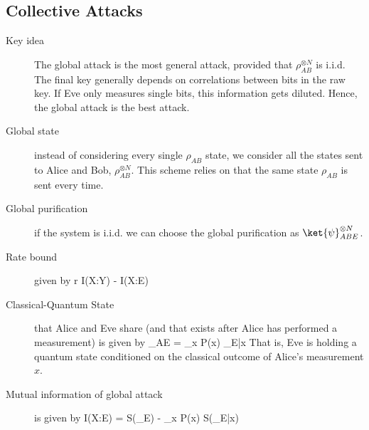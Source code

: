 \subsection{Collective Attacks}
\begin{description}

\item[Key idea] The global attack is the most general attack, provided that $\rho^{\otimes N}_{AB}$ is i.i.d. The final key generally depends on correlations between bits in the raw key. If Eve only measures single bits, this information gets diluted. Hence, the global attack is the best attack. 

\item[Global state] instead of considering every single $\rho_{AB}$ state, we consider all the states sent to Alice and Bob, $\rho_{AB}^{\otimes N}$. This scheme relies on that the same state $\rho_{AB}$ is sent every time. 

\item[Global purification] if the system is i.i.d. we can choose the global purification as $\ket{\psi}_{ABE}^{\otimes N}$. 

\item[Rate bound] given by 
\beq
r \geq I(X:Y) - I(X:E)
\eeq

\item[Classical-Quantum State] that Alice and Eve share (and that exists after Alice has performed a measurement) is given by 
\beq
\rho_{AE} = \sum_x P(x)  \otimes \rho_{E|x}
\eeq
That is, Eve is holding a quantum state conditioned on the classical outcome of Alice's measurement $x$. 

\item[Mutual information of global attack] is given by 
\beq
I(X:E) = S(\rho_E) - \sum_x P(x) S(\rho_{E|x})
\eeq

\end{description}
